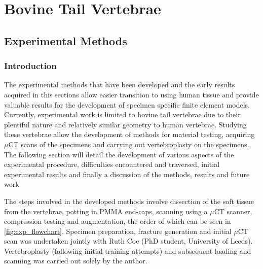 \chapter{Bovine Tail Vertebrae}\label{chap_bov}

\section{Experimental Methods}\label{experimental-methods}

\subsection{Introduction}

The experimental methods that have been developed and the early results acquired in this sections allow easier transition to using human tissue  and provide valuable results for the development of specimen specific finite element models. Currently, experimental work is limited to bovine tail vertebrae due to their plentiful nature and relatively similar geometry to human vertebrae. Studying these vertebrae allow the development of methods for material testing, acquiring $\mu$CT scans of the specimens and carrying out vertebroplasty on the specimens. The following section will detail the development of various aspects of the experimental procedure, difficulties encountered and traversed, initial experimental results and finally a discussion of the methods, results and future work.

The steps involved in the developed methods involve dissection of the soft tissue from the vertebrae, potting in PMMA end-caps, scanning using a $\mu$CT scanner, compression testing and augmentation, the order of which can be seen in \cref{fig:exp_flowchart}.
Specimen preparation, fracture generation and initial $\mu$CT scan was undertaken jointly with Ruth Coe (PhD student, University of Leeds). Vertebroplasty (following initial training attempts) and subsequent loading and scanning was carried out solely by the author.

